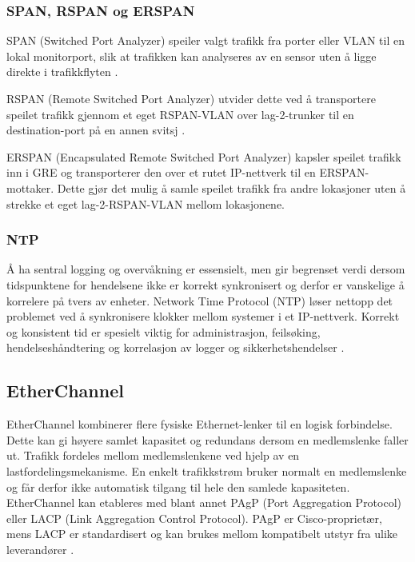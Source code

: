 \subsubsection{SPAN, RSPAN og ERSPAN}

SPAN (Switched Port Analyzer) speiler valgt trafikk fra porter eller VLAN til en lokal monitorport, slik at trafikken kan analyseres av en sensor uten å ligge direkte i trafikkflyten \cite{cisco_span_rspan_3850}.

RSPAN (Remote Switched Port Analyzer) utvider dette ved å transportere speilet trafikk gjennom et eget RSPAN-VLAN over lag-2-trunker til en destination-port på en annen svitsj \cite{cisco_span_rspan_3850}.

ERSPAN (Encapsulated Remote Switched Port Analyzer) kapsler speilet trafikk inn i GRE og transporterer den over et rutet IP-nettverk til en ERSPAN-mottaker. Dette gjør det mulig å samle speilet trafikk fra andre lokasjoner uten å strekke et eget lag-2-RSPAN-VLAN mellom lokasjonene.\cite{cisco_erspan_3850}

\subsubsection{NTP}

Å ha sentral logging og overvåkning er essensielt, men gir begrenset verdi dersom tidspunktene for hendelsene ikke er korrekt synkronisert og derfor er vanskelige å korrelere på tvers av enheter. Network Time Protocol (NTP) løser nettopp det problemet ved å synkronisere klokker mellom systemer i et IP-nettverk. Korrekt og konsistent tid er spesielt viktig for administrasjon, feilsøking, hendelseshåndtering og korrelasjon av logger og sikkerhetshendelser \cite{nsm_n03}.

\subsection{EtherChannel}

EtherChannel kombinerer flere fysiske Ethernet-lenker til en logisk forbindelse. Dette kan gi høyere samlet kapasitet og redundans dersom en medlemslenke faller ut. Trafikk fordeles mellom medlemslenkene ved hjelp av en lastfordelingsmekanisme. En enkelt trafikkstrøm bruker normalt en medlemslenke og får derfor ikke automatisk tilgang til hele den samlede kapasiteten. EtherChannel kan etableres med blant annet PAgP (Port Aggregation Protocol) eller LACP (Link Aggregation Control Protocol). PAgP er Cisco-proprietær, mens LACP er standardisert og kan brukes mellom kompatibelt utstyr fra ulike leverandører \cite{forsvaret_nettverk_rolle1}.

